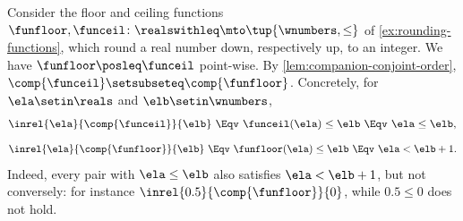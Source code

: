 \begin{example}
    Consider the floor and ceiling functions $\funfloor, \funceil \colon \realswithleq \mto \tup{\wnumbers, \leq}$ of \cref{ex:rounding-functions}, which round a real number down, respectively up, to an integer.
    We have $\funfloor \posleq \funceil$ point-wise.
    By \cref{lem:companion-conjoint-order}, $\comp{\funceil} \setsubseteq \comp{\funfloor}$.
    Concretely, for $\ela \setin \reals$ and $\elb \setin \wnumbers$,
    \begin{equation}
        \inrel{\ela}{\comp{\funceil}}{\elb}
        \ \Eqv\
        \funceil(\ela) \leq \elb
        \ \Eqv\
        \ela \leq \elb,
    \end{equation}
    \begin{equation}
        \inrel{\ela}{\comp{\funfloor}}{\elb}
        \ \Eqv\
        \funfloor(\ela) \leq \elb
        \ \Eqv\
        \ela < \elb + 1.
    \end{equation}
    Indeed, every pair with $\ela \leq \elb$ also satisfies $\ela < \elb + 1$, but not conversely: for instance $\inrel{0.5}{\comp{\funfloor}}{0}$, while $0.5 \leq 0$ does not hold.
\end{example}
